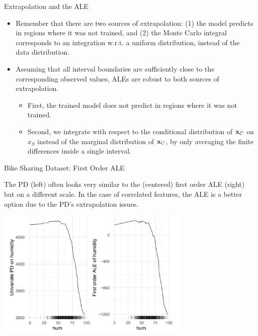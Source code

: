\begin{vbframe}{Extrapolation and the ALE}
\begin{itemize}

\item Remember that there are two sources of extrapolation: (1) the model predicts in regions where it was not trained, and (2) the Monte Carlo integral corresponds to an integration w.r.t. a uniform distribution, instead of the data distribution.
\item Assuming that all interval boundaries are sufficiently close to the corresponding observed values, ALEs are robust to both sources of extrapolation.
  \begin{itemize}
    \item First, the trained model does not predict in regions where it was not trained.
    \item Second, we integrate with respect to the conditional distribution of $\xv_C$ on $x_S$ instead of the marginal distribution of $\xv_C$, by only averaging the finite differences inside a single interval.
  \end{itemize}
\end{itemize}
\end{vbframe}


\begin{vbframe}{Bike Sharing Dataset: First Order ALE}

The PD (left) often looks very similar to the (centered) first order ALE (right) but on a different scale. In the case of correlated features, the ALE is a better option due to the PD's extrapolation issues.


\begin{center}
\includegraphics[width=0.7\textwidth]{figure_man/first-order.png}
\end{center}


\end{vbframe}

